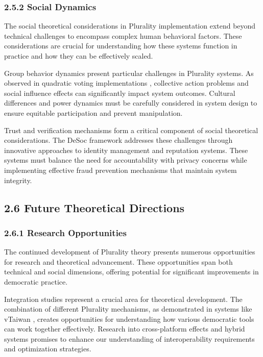 \hypertarget{social-dynamics}{%
\subsubsection{2.5.2 Social Dynamics}\label{social-dynamics}}

The social theoretical considerations in Plurality implementation extend beyond technical challenges to encompass complex human behavioral factors. These considerations are crucial for understanding how these systems function in practice and how they can be effectively scaled.

Group behavior dynamics present particular challenges in Plurality systems. As observed in quadratic voting implementations \citep{buterin2019flexible}, collective action problems and social influence effects can significantly impact system outcomes. Cultural differences and power dynamics must be carefully considered in system design to ensure equitable participation and prevent manipulation.

Trust and verification mechanisms form a critical component of social theoretical considerations. The DeSoc framework \citep{weyl2022decentralized} addresses these challenges through innovative approaches to identity management and reputation systems. These systems must balance the need for accountability with privacy concerns while implementing effective fraud prevention mechanisms that maintain system integrity.

\hypertarget{future-theoretical-directions}{%
\subsection{2.6 Future Theoretical Directions}\label{future-theoretical-directions}}

\hypertarget{research-opportunities}{%
\subsubsection{2.6.1 Research Opportunities}\label{research-opportunities}}

The continued development of Plurality theory presents numerous opportunities for research and theoretical advancement. These opportunities span both technical and social dimensions, offering potential for significant improvements in democratic practice.

Integration studies represent a crucial area for theoretical development. The combination of different Plurality mechanisms, as demonstrated in systems like vTaiwan \citep{vtaiwan2023}, creates opportunities for understanding how various democratic tools can work together effectively. Research into cross-platform effects and hybrid systems promises to enhance our understanding of interoperability requirements and optimization strategies.

